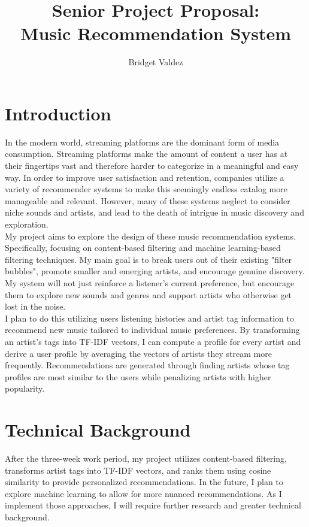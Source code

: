 \documentclass[10pt,twocolumn]{article}
\title{Senior Project Proposal: \\ Music Recommendation System}
\author{Bridget Valdez}
\affiliation{Occidental College}
\begin{document}
\maketitle

\section{Introduction}

In the modern world, streaming platforms are the dominant form of media consumption. Streaming platforms make the amount of content a user has at their fingertips vast and therefore harder to categorize in a meaningful and easy way. In order to improve user satisfaction and retention, companies utilize a variety of recommender systems to make this seemingly endless catalog more manageable and relevant. However, many of these systems neglect to consider niche sounds and artists, and lead to the death of intrigue in music discovery and exploration.\\
\indent My project aims to explore the design of these music recommendation systems. Specifically, focusing on content-based filtering and machine learning-based filtering techniques. My main goal is to break users out of their existing "filter bubbles", promote smaller and emerging artists, and encourage genuine discovery. My system will not just reinforce a listener's current preference, but encourage them to explore new sounds and genres and support artists who otherwise get lost in the noise.\\
\indent I plan to do this utilizing users listening histories and artist tag information to recommend new music tailored to individual music preferences. By transforming an artist's tags into TF-IDF vectors, I can compute a profile for every artist and derive a user profile by averaging the vectors of artists they stream more frequently. Recommendations are generated through finding artists whose tag profiles are most similar to the users while penalizing artists with higher popularity. 

\section{Technical Background}
After the three-week work period, my project utilizes content-based filtering, transforms artist tags into TF-IDF vectors, and ranks them using cosine similarity to provide personalized recommendations. In the future, I plan to explore machine learning to allow for more nuanced recommendations. As I implement those approaches, I will require further research and greater technical background. 
\end{document}
